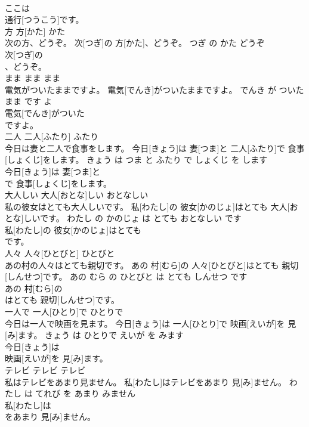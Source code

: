 \documentclass[8pt]{extreport}
\begin{document}
\begin{CJK}{UTF8}{min}
\\	ここは
\\	通行[つうこう]です。			
\\	方	方[かた]	かた	
\\	次の方、どうぞ。	次[つぎ]の 方[かた]、どうぞ。	つぎ の かた どうぞ	
\\	次[つぎ]の
\\	、どうぞ。			
\\	まま	まま	まま	
\\	電気がついたままですよ。	電気[でんき]がついたままですよ。	でんき が ついた まま です よ	
\\	電気[でんき]がついた
\\	ですよ。			
\\	二人	二人[ふたり]	ふたり	
\\	今日は妻と二人で食事をします。	今日[きょう]は 妻[つま]と 二人[ふたり]で 食事[しょくじ]をします。	きょう は つま と ふたり で しょくじ を します	
\\	今日[きょう]は 妻[つま]と
\\	で 食事[しょくじ]をします。			
\\	大人しい	大人[おとな]しい	おとなしい	
\\	私の彼女はとても大人しいです。	私[わたし]の 彼女[かのじょ]はとても 大人[おとな]しいです。	わたし の かのじょ は とても おとなしい です	
\\	私[わたし]の 彼女[かのじょ]はとても
\\	です。			
\\	人々	人々[ひとびと]	ひとびと	
\\	あの村の人々はとても親切です。	あの 村[むら]の 人々[ひとびと]はとても 親切[しんせつ]です。	あの むら の ひとびと は とても しんせつ です	
\\	あの 村[むら]の
\\	はとても 親切[しんせつ]です。			
\\	一人で	一人[ひとり]で	ひとりで	
\\	今日は一人で映画を見ます。	今日[きょう]は 一人[ひとり]で 映画[えいが]を 見[み]ます。	きょう は ひとりで えいが を みます	
\\	今日[きょう]は
\\	映画[えいが]を 見[み]ます。			
\\	テレビ	テレビ	テレビ	
\\	私はテレビをあまり見ません。	私[わたし]はテレビをあまり 見[み]ません。	わたし は てれび を あまり みません	
\\	私[わたし]は
\\	をあまり 見[み]ません。			

\end{CJK}
\end{document}
